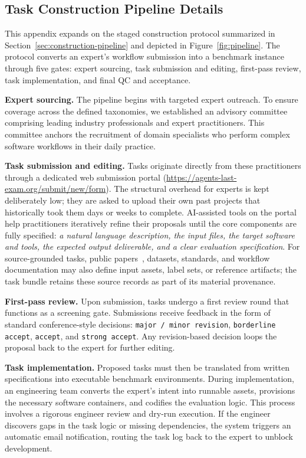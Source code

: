 \subsection{Task Construction Pipeline Details}
\label{app:construction-pipeline}

This appendix expands on the staged construction protocol summarized in Section~\ref{sec:construction-pipeline} and depicted in Figure~\ref{fig:pipeline}. The protocol converts an expert's workflow submission into a benchmark instance through five gates: expert sourcing, task submission and editing, first-pass review, task implementation, and final QC and acceptance.

\noindent \textbf{Expert sourcing.}
The pipeline begins with targeted expert outreach. To ensure coverage across the defined taxonomies, we established an advisory committee comprising leading industry professionals and expert practitioners. This committee anchors the recruitment of domain specialists who perform complex software workflows in their daily practice.

\noindent \textbf{Task submission and editing.}
Tasks originate directly from these practitioners through a dedicated web submission portal (\url{https://agents-last-exam.org/submit/new/form}). The structural overhead for experts is kept deliberately low; they are asked to upload their own past projects that historically took them days or weeks to complete. AI-assisted tools on the portal help practitioners iteratively refine their proposals until the core components are fully specified: \textit{a natural language description, the input files, the target software and tools, the expected output deliverable, and a clear evaluation specification}.
For source-grounded tasks, public papers~\citep{prasad2017video,guo2023asynchronous}, datasets, standards, and workflow documentation may also define input assets, label sets, or reference artifacts; the task bundle retains these source records as part of its material provenance.

\noindent \textbf{First-pass review.}
Upon submission, tasks undergo a first review round that functions as a screening gate. Submissions receive feedback in the form of standard conference-style decisions: \texttt{major / minor revision}, \texttt{borderline accept}, \texttt{accept}, and \texttt{strong accept}. Any revision-based decision loops the proposal back to the expert for further editing.

\noindent \textbf{Task implementation.}
Proposed tasks must then be translated from written specifications into executable benchmark environments. During implementation, an engineering team converts the expert's intent into runnable assets, provisions the necessary software containers, and codifies the evaluation logic. This process involves a rigorous engineer review and dry-run execution. If the engineer discovers gaps in the task logic or missing dependencies, the system triggers an automatic email notification, routing the task log back to the expert to unblock development.

